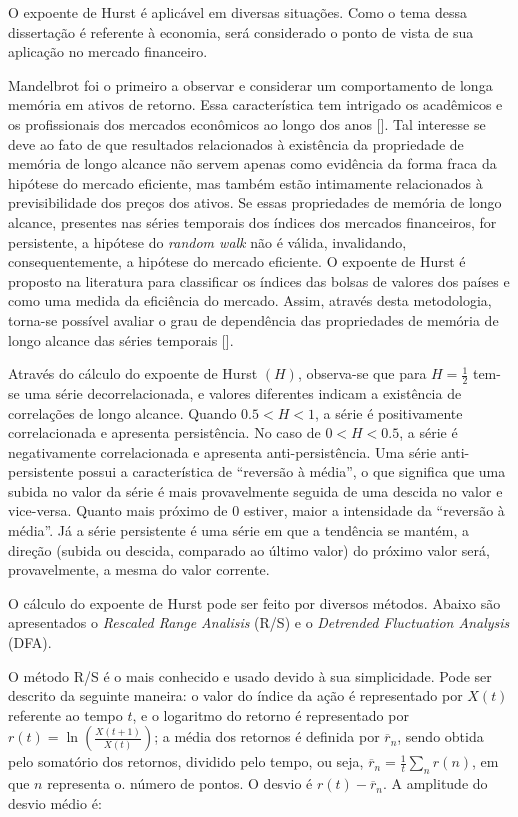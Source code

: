\documentclass[brazil,ruledheader]{abnt}
\renewcommand{\cite}[1]{[\citeonline{#1}]}
\begin{document}
O expoente de Hurst é aplicável em diversas situações. Como o tema dessa
dissertação é referente à economia, será considerado o ponto de vista de sua
aplicação  no mercado financeiro.

Mandelbrot foi o primeiro a observar e considerar um comportamento de longa
memória em ativos de retorno. Essa característica tem intrigado os acadêmicos e
os profissionais dos mercados econômicos ao longo dos anos \cite{CaTa08}.
Tal interesse se deve ao fato de que resultados relacionados à existência da
propriedade de memória de longo alcance não servem apenas como evidência da
forma fraca da hipótese do mercado eficiente, mas também estão intimamente
relacionados à previsibilidade dos preços dos ativos. Se essas propriedades de
memória de longo alcance, presentes nas séries temporais dos índices dos
mercados financeiros, for persistente, a hipótese do \emph{random walk} não é
válida,
 invalidando, consequentemente, a hipótese do mercado eficiente. O expoente de
Hurst é proposto na literatura para classificar os índices das bolsas de valores
dos países e como uma medida da eficiência do mercado. Assim, através desta
metodologia, torna-se possível avaliar o grau de dependência das propriedades de
memória de longo alcance das séries temporais
\cite{CaTa08,CoVa03,CaTa04,CaCaSt04,LiAnFi09}.

Através do cálculo do expoente de Hurst $(H)$, observa-se que para
$H=\frac{1}{2}$ tem-se uma série decorrelacionada, e valores diferentes indicam
a existência de correlações de longo alcance. Quando $0.5< H <1$, a série é
positivamente correlacionada e apresenta persistência. No caso de $0< H <0.5$, a
série é negativamente correlacionada e apresenta anti-persistência. Uma série
anti-persistente possui a característica de ``reversão à média'', o que
significa que uma subida no valor da série é mais provavelmente seguida de uma
descida no valor e vice-versa. Quanto mais próximo de 0 estiver, maior a
intensidade da ``reversão à média''. Já a série persistente é uma série em que a
tendência se mantém, a direção (subida ou descida, comparado ao último valor) do
próximo valor será, provavelmente, a mesma do valor corrente.

O cálculo do expoente de Hurst pode ser feito por diversos métodos. Abaixo são
apresentados o \emph{Rescaled Range Analisis} (R/S) e o \emph{Detrended
Fluctuation Analysis} (DFA).

O método R/S é o mais conhecido e usado devido à sua simplicidade. Pode ser
descrito da seguinte maneira: o valor do índice da ação é representado por
$X(t)$ referente ao tempo $t$, e o logaritmo do retorno é representado por
$r(t)=\ln \left( \frac{X(t+1)}{X(t)}\right)$; a média dos retornos é definida
por $\overline{r}_n$, sendo obtida pelo somatório dos retornos, dividido pelo
tempo, ou seja, $\overline{r}_n=\frac{1}{t}\sum_n r(n)$, em que $n$ representa
o. número de pontos. O desvio é
$r(t)-\overline{r}_n$. A amplitude do desvio médio é:
\end{document}
